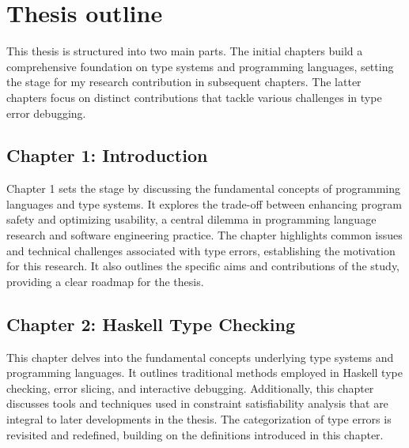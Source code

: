 





\section{Thesis outline}

 This thesis is structured into two main parts. The initial chapters build a comprehensive foundation on type systems and programming languages, setting the stage for my research contribution in subsequent chapters. The latter chapters focus on distinct contributions that tackle various challenges in type error debugging.

\subsection{Chapter 1: Introduction}
Chapter 1 sets the stage by discussing the fundamental concepts of programming languages and type systems. It explores the trade-off between enhancing program safety and optimizing usability, a central dilemma in programming language research and software engineering practice. The chapter highlights common issues and technical challenges associated with type errors, establishing the motivation for this research. It also outlines the specific aims and contributions of the study, providing a clear roadmap for the thesis.

\subsection{Chapter 2: Haskell Type Checking}
This chapter delves into the fundamental concepts underlying type systems and programming languages. It outlines traditional methods employed in Haskell type checking, error slicing, and interactive debugging. Additionally, this chapter discusses tools and techniques used in constraint satisfiability analysis that are integral to later developments in the thesis. The categorization of type errors is revisited and redefined, building on the definitions introduced in this chapter.
    
